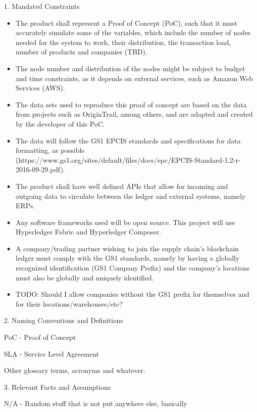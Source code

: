 	1. Mandated Constraints
    \begin{itemize}
		\item The product shall represent a Proof of Concept (PoC), such that it must accurately simulate some of the variables, which include the number of nodes needed for the system to work, their distribution, the transaction load, number of products and companies (TBD).
		\item The node number and distribution of the nodes might be subject to budget and time constraints, as it depends on external services, such as Amazon Web Services (AWS).
		\item The data sets used to reproduce this proof of concept are based on the data from projects such as OriginTrail, among others, and are adapted and created by the developer of this PoC.
		\item The data will follow the GS1 EPCIS standards and specifications for data formatting, as possible (https://www.gs1.org/sites/default/files/docs/epc/EPCIS-Standard-1.2-r-2016-09-29.pdf).
		\item The product shall have well defined APIs that allow for incoming and outgoing data to circulate between the ledger and external systems, namely ERPs.
		\item Any software frameworks used will be open source. This project will use Hyperledger Fabric and Hyperledger Composer.
		\item A company/trading partner wishing to join the supply chain's blockchain ledger must comply with the GS1 standards, namely by having a globally recognized identification (GS1 Company Prefix) and the company's locations must also be globally and uniquely identified.
		\item TODO: Should I allow companies without the GS1 prefix for themselves and for their locations/warehouses/etc? 
        \end{itemize}
	2. Naming Conventions and Definitions
		\par PoC - Proof of Concept
		\par SLA - Service Level Agreement
		\par Other glossary terms, acronyms and whatever.
		
	3. Relevant Facts and Assumptions
		\par N/A - Random stuff that is not put anywhere else, basically
	
